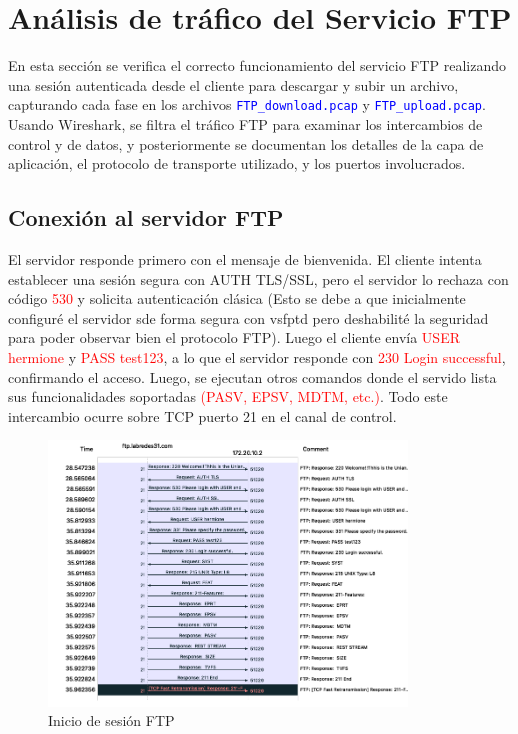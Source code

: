 \documentclass[10pt]{article}
\begin{document}
\renewcommand{\thesection}{8.\arabic{section}}
\section{Análisis de tráfico del Servicio FTP}

En esta sección se verifica el correcto funcionamiento del servicio FTP realizando una sesión autenticada desde el cliente para descargar y subir un archivo, capturando cada fase en los archivos \textcolor{blue}{\texttt{FTP\_download.pcap}} y \textcolor{blue}{\texttt{FTP\_upload.pcap}}. Usando Wireshark, se filtra el tráfico FTP para examinar los intercambios de control y de datos, y posteriormente se documentan los detalles de la capa de aplicación, el protocolo de transporte utilizado, y los puertos involucrados. 

\subsection{Conexión al servidor FTP}
El servidor responde primero con el mensaje de bienvenida. El cliente intenta establecer una sesión segura con AUTH TLS/SSL, pero el servidor lo rechaza con código \textcolor{red}{530} y solicita autenticación clásica (Esto se debe a que inicialmente configuré el servidor sde forma segura con vsfptd pero deshabilité la seguridad para poder observar bien el protocolo FTP). Luego el cliente envía \textcolor{red}{USER hermione} y \textcolor{red}{PASS test123}, a lo que el servidor responde con \textcolor{red}{230 Login successful}, confirmando el acceso. Luego, se ejecutan otros comandos donde el servido lista sus funcionalidades soportadas \textcolor{red}{(PASV, EPSV, MDTM, etc.)}. Todo este intercambio ocurre sobre TCP puerto 21 en el canal de control.


\begin{figure}[H]
    \centering
    \includegraphics[width=0.85\textwidth]{lab-02-screenshots/8.3-FTP-start-session}
    \caption{Inicio de sesión FTP}
\end{figure}
\end{document}
